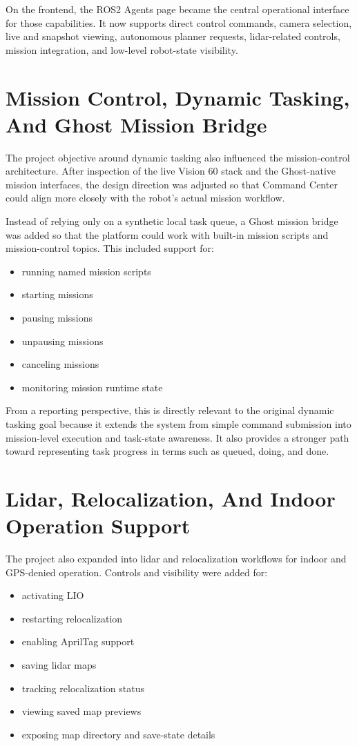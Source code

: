 \documentclass[11pt]{article}
\begin{document}
On the frontend, the ROS2 Agents page became the central operational interface for those capabilities. It now supports direct control commands, camera selection, live and snapshot viewing, autonomous planner requests, lidar-related controls, mission integration, and low-level robot-state visibility.

\section{Mission Control, Dynamic Tasking, And Ghost Mission Bridge}

The project objective around dynamic tasking also influenced the mission-control architecture. After inspection of the live Vision 60 stack and the Ghost-native mission interfaces, the design direction was adjusted so that Command Center could align more closely with the robot's actual mission workflow.

Instead of relying only on a synthetic local task queue, a Ghost mission bridge was added so that the platform could work with built-in mission scripts and mission-control topics. This included support for:

\begin{itemize}
  \item running named mission scripts
  \item starting missions
  \item pausing missions
  \item unpausing missions
  \item canceling missions
  \item monitoring mission runtime state
\end{itemize}

From a reporting perspective, this is directly relevant to the original dynamic tasking goal because it extends the system from simple command submission into mission-level execution and task-state awareness. It also provides a stronger path toward representing task progress in terms such as queued, doing, and done.

\section{Lidar, Relocalization, And Indoor Operation Support}

The project also expanded into lidar and relocalization workflows for indoor and GPS-denied operation. Controls and visibility were added for:

\begin{itemize}
  \item activating LIO
  \item restarting relocalization
  \item enabling AprilTag support
  \item saving lidar maps
  \item tracking relocalization status
  \item viewing saved map previews
  \item exposing map directory and save-state details
\end{itemize}
\end{document}
